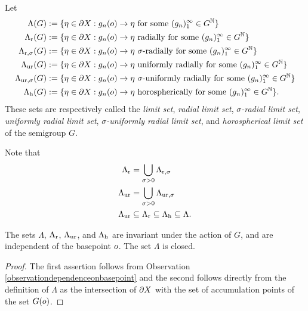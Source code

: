 \begin{definition}
\label{definitionlimitset}
Let
\begin{align*}
\Lambda(G) &:= \{\eta\in\del X: g_n(\zero)\to \eta \text{ for some $(g_n)_1^\infty \in G^\N$}\}\\
\Lr(G) &:= \{\eta\in\del X: g_n(\zero)\to \eta \text{ radially for some $(g_n)_1^\infty \in G^\N$}\}\\
\Lrsigma(G) &:= \{\eta\in\del X: g_n(\zero)\to \eta \text{ $\sigma$-radially for some $(g_n)_1^\infty \in G^\N$}\}\\
\Lur(G) &:= \{\eta\in\del X: g_n(\zero)\to \eta \text{ uniformly radially for some $(g_n)_1^\infty \in G^\N$}\}\\
\Lursigma(G) &:= \{\eta\in\del X: g_n(\zero)\to \eta \text{ $\sigma$-uniformly radially for some $(g_n)_1^\infty \in G^\N$}\}\\
\Lh(G) &:= \{\eta\in\del X: g_n(\zero)\to \eta \text{ horospherically for some $(g_n)_1^\infty \in G^\N$}\}.
\end{align*}
These sets are respectively called the \emph{limit set}, \emph{radial limit set}, \emph{$\sigma$-radial limit set}, \emph{uniformly radial limit set}, \emph{$\sigma$-uniformly radial limit set}, and \emph{horospherical limit set} of the semigroup $G$.
\end{definition}
Note that
\begin{align*}
\Lambda_{\mathrm r} &= \bigcup_{\sigma > 0}\Lambda_{\mathrm r,\sigma}\\
\Lambda_{\mathrm{ur}} &= \bigcup_{\sigma > 0}\Lambda_{\mathrm{ur},\sigma}\\
\Lambda_{\mathrm{ur}} &\subseteq \Lambda_{\mathrm r} \subseteq \Lambda_{\mathrm h} \subseteq \Lambda.
\end{align*}

\begin{observation}
\label{observationlimitsets}
The sets $\Lambda$, $\Lambda_{\mathrm r}$, $\Lambda_{\mathrm{ur}}$, and $\Lambda_{\mathrm h}$ are invariant under the action of $G$, and are independent of the basepoint $o$. The set $\Lambda$ is closed.
\end{observation}
\begin{proof}
The first assertion follows from Observation \ref{observationdependenceonbasepoint} and the second follows directly from the definition of $\Lambda$ as the intersection of $\partial X$ with the set of accumulation points of the set $G(o)$.
\end{proof}



